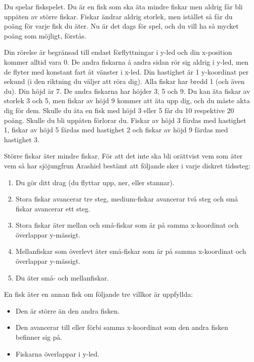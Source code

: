 
Du spelar fiskspelet. Du är en fisk som ska äta mindre fiskar men aldrig får
bli uppäten av större fiskar. Fiskar ändrar aldrig storlek, men istället så får
du poäng för varje fisk du äter. Nu är det dags för spel, och du vill ha så mycket
poäng som möjligt, förstås.

Din rörelse är begränsad till endast förflyttningar i y-led och din x-position
kommer alltid vara 0. De andra fiskarna å andra sidan rör sig aldrig i y-led,
men de flyter med konstant fart åt vänster i x-led. Din hastighet är 1
y-koordinat per sekund (i den riktning du väljer att röra dig). Alla fiskar har
bredd 1 (och även du). Din höjd är 7. De andra fiskarna har höjder 3, 5 och
9. Du kan äta fiskar av storlek 3 och 5, men fiskar av höjd 9 kommer att äta
upp dig, och du måste akta dig för dem. Skulle du äta en fisk med höjd 3 eller
5 får du 10 respektive 20 poäng. Skulle du bli uppäten förlorar du. Fiskar av
höjd 3 färdas med hastighet 1, fiskar av höjd 5 färdas med hastighet 2 och
fiskar av höjd 9 färdas med hastighet 3.

Större fiskar äter mindre fiskar. För att det inte ska bli orättvist vem som
äter vem så har sjöjungfrun Arashiel bestämt att följande sker i varje diskret
tidssteg:

\begin{enumerate}
  \item
     Du gör ditt drag (du flyttar upp, ner, eller stannar).
  \item
     Stora fiskar avancerar tre steg, medium-fiskar avancerar två steg och små fiskar avancerar ett steg.
  \item
     Stora fiskar äter mellan och små-fiskar som är på samma x-koordinat och överlappar y-mässigt.
  \item
     Mellanfiskar som överlevt äter små-fiskar som är på samma x-koordinat och överlappar y-mässigt.
  \item
     Du äter små- och mellanfiskar.
\end{enumerate}

En fisk äter en annan fisk om följande tre villkor är uppfyllda:

\begin{itemize}
  \item
    Den är större än den andra fisken.
  \item
    Den avancerar till eller förbi samma x-koordinat som den andra fisken befinner sig på.
  \item
    Fiskarna överlappar i y-led.
\end{itemize}

